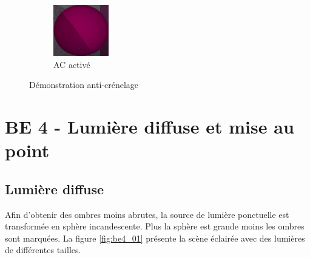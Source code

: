 \documentclass[12pt,a4paper,twoside]{report}
\begin{document}
\begin{figure}[H]
\begin{subfigure}{.45\textwidth}
		\includegraphics[width=1.\linewidth]{be3_03_1000_1}
		\caption{AC activé}
		\label{fig:be3_03_1000_1}
	\end{subfigure}
	\caption{Démonstration anti-crénelage}
\end{figure}

\newpage\section{BE 4 - Lumière diffuse et mise au point}

\subsection{Lumière diffuse}

Afin d'obtenir des ombres moins abrutes, la source de lumière ponctuelle est transformée en sphère incandescente. Plus la sphère est grande moins les ombres sont marquées. La figure \ref{fig:be4_01} présente la scène éclairée avec des lumières de différentes tailles.
\end{document}
